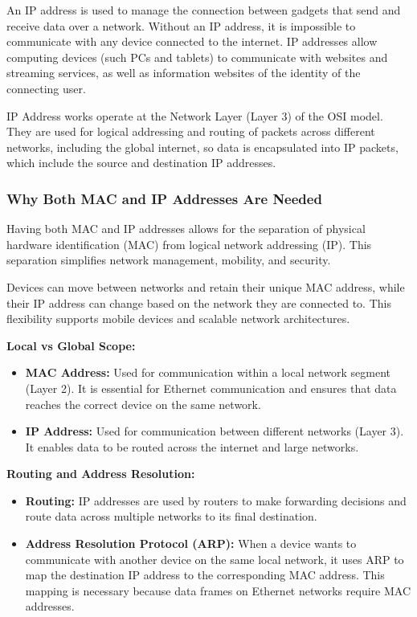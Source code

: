 \documentclass{article}
\begin{document}
An IP address is used to manage the connection between gadgets that send and receive data over a network. Without an IP address, it is impossible to communicate with any device connected to the internet. IP addresses allow computing devices (such PCs and tablets) to communicate with websites and streaming services, as well as information websites of the identity of the connecting user.

IP Address works operate at the Network Layer (Layer 3) of the OSI model. They are used for logical addressing and routing of packets across different networks, including the global internet, so data is encapsulated into IP packets, which include the source and destination IP addresses.

\subsubsection{Why Both MAC and IP Addresses Are Needed}

Having both MAC and IP addresses allows for the separation of physical hardware identification (MAC) from logical network addressing (IP). This separation simplifies network management, mobility, and security. 

Devices can move between networks and retain their unique MAC address, while their IP address can change based on the network they are connected to. This flexibility supports mobile devices and scalable network architectures.

\textbf{Local vs Global Scope:}
\begin{itemize}
    \item \textbf{MAC Address:} Used for communication within a local network segment (Layer 2). It is essential for Ethernet communication and ensures that data reaches the correct device on the same network.
    \item \textbf{IP Address:} Used for communication between different networks (Layer 3). It enables data to be routed across the internet and large networks.
\end{itemize}

\textbf{Routing and Address Resolution:}

\begin{itemize}
    \item \textbf{Routing:} IP addresses are used by routers to make forwarding decisions and route data across multiple networks to its final destination.
    \item \textbf{Address Resolution Protocol (ARP):} When a device wants to communicate with another device on the same local network, it uses ARP to map the destination IP address to the corresponding MAC address. This mapping is necessary because data frames on Ethernet networks require MAC addresses.
\end{itemize}
\end{document}
